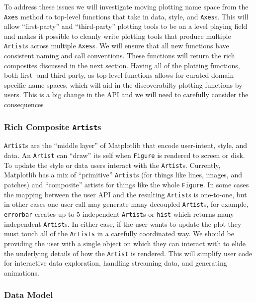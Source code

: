 \documentclass[11pt]{article}  %
\begin{document}
To address these issues we will investigate moving plotting name
space from the \texttt{Axes} method to top-level functions that take in
data, style, and \texttt{Axes}s.
This will allow ``first-party'' and
``third-party'' plotting tools to be on a level playing field and
makes it possible to cleanly write plotting tools that produce
multiple \texttt{Artist}s across multiple \texttt{Axes}s.
We will ensure that all new functions have consistent naming and call
conventions.
These
functions will return the rich composites discussed in the next
section.
Having all of the plotting functions, both first- and third-party, as
top level functions allows for curated domain-specific name spaces,
which will aid in the discoverabilty plotting functions by users.
This is a big change in the API and we will need to carefully consider
the consequences

\subsubsection{Rich Composite \texttt{Artist}s}

\texttt{Artist}s are the ``middle layer'' of Matplotlib that encode
user-intent, style, and data.  An \texttt{Artist} can ``draw'' its
self when \texttt{Figure} is rendered to screen or disk.
To update the style or data users interact with the  \texttt{Artist}s.
Currently, Matplotlib has a mix of ``primitive'' \texttt{Artist}s (for
things like lines, images, and patches) and ``composite'' artists for
things like the whole \texttt{Figure}.
In some cases the mapping between the user API and the resulting
\texttt{Artist}s is one-to-one, but in other cases one user call may
generate many decoupled \texttt{Artist}s, for example,
\texttt{errorbar} creates up to 5 independent \texttt{Artist}s or
\texttt{hist} which returns many independent \texttt{Artist}s.  In either
case, if the user wants to update the plot they must touch all of the
\texttt{Artists} in a carefully coordinated way.
We should be providing the user with a single object on which
they can interact with to elide the underlying details of how the
\texttt{Artist} is rendered.
This will simplify user code for interactive data exploration,
handling streaming data, and generating animations.




\subsubsection{Data Model}
\end{document}
